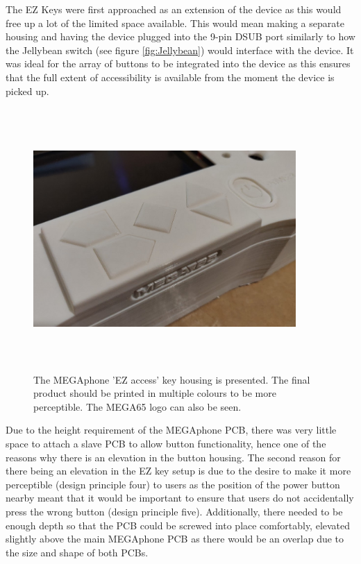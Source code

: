 The EZ Keys were first approached as an extension of the device as this would free up a lot of the limited space available.
This would mean making a separate housing and having the device plugged into the 9-pin DSUB port similarly to how the Jellybean switch (see figure \ref{fig:Jellybean}) would interface with the device.
It was ideal for the array of buttons to be integrated into the device as this ensures that the full extent of accessibility is available from the moment the device is picked up.

\begin{figure} [h]
    \centering
    \includegraphics[width=10cm,height=10cm,keepaspectratio]{Figures/easy_keys_housing.png}
    \caption{The MEGAphone 'EZ access' key housing is presented. The final product should be printed in multiple colours to be more perceptible. The MEGA65 logo can also be seen.}
    \label{fig:EZkeys}
\end{figure}

Due to the height requirement of the MEGAphone PCB, there was very little space to attach a slave PCB to allow button functionality, hence one of the reasons why there is an elevation in the button housing.
The second reason for there being an elevation in the EZ key setup is due to the desire to make it more perceptible (design principle four) to users as the position of the power button nearby meant that it would be important to ensure that users do not accidentally press the wrong button (design principle five).
Additionally, there needed to be enough depth so that the PCB could be screwed into place comfortably, elevated slightly above the main MEGAphone PCB as there would be an overlap due to the size and shape of both PCBs.

